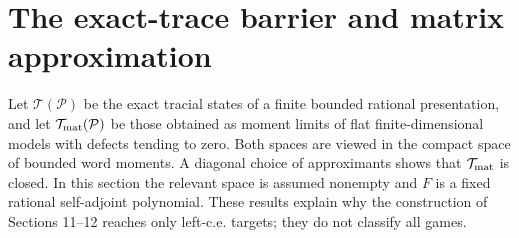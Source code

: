 \section{The exact-trace barrier and matrix approximation}\label{sec:limits}
Let $\mathcal T(\mathcal P)$ be the exact tracial states of a finite bounded rational presentation, and let $\mathcal T_{\rm mat}(\mathcal P)$ be those obtained as moment limits of flat finite-dimensional models with defects tending to zero. Both spaces are viewed in the compact space of bounded word moments. A diagonal choice of approximants shows that $\mathcal T_{\rm mat}$ is closed. In this section the relevant space is assumed nonempty and $F$ is a fixed rational self-adjoint polynomial. These results explain why the construction of Sections 11--12 reaches only left-c.e. targets; they do not classify all games.

